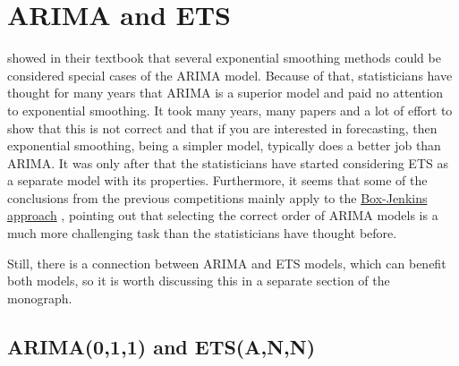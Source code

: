 \documentclass[
]{book}
\theoremstyle{definition}
\theoremstyle{definition}
\theoremstyle{definition}
\theoremstyle{definition}
\theoremstyle{remark}
\begin{document}
\hypertarget{ARIMAandETS}{%
\section{ARIMA and ETS}\label{ARIMAandETS}}

\citet{Box1976} showed in their textbook that several exponential smoothing methods could be considered special cases of the ARIMA model. Because of that, statisticians have thought for many years that ARIMA is a superior model and paid no attention to exponential smoothing. It took many years, many papers and a lot of effort \citep{Makridakis1982, Fildes1998, Makridakis2000} to show that this is not correct and that if you are interested in forecasting, then exponential smoothing, being a simpler model, typically does a better job than ARIMA. It was only after \citet{Ord1997} that the statisticians have started considering ETS as a separate model with its properties. Furthermore, it seems that some of the conclusions from the previous competitions mainly apply to the \protect\hyperlink{BJApproach}{Box-Jenkins approach} \citep[for example, see][]{Makridakis1997}, pointing out that selecting the correct order of ARIMA models is a much more challenging task than the statisticians have thought before.

Still, there is a connection between ARIMA and ETS models, which can benefit both models, so it is worth discussing this in a separate section of the monograph.

\hypertarget{ARIMAETS011}{%
\subsection{ARIMA(0,1,1) and ETS(A,N,N)}\label{ARIMAETS011}}
\end{document}
